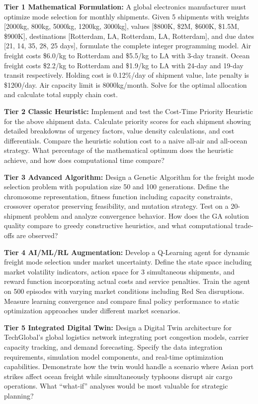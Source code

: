 \documentclass{article}
\begin{document}
\textbf{Tier 1 Mathematical Formulation:}
A global electronics manufacturer must optimize mode selection for monthly shipments. Given 5 shipments with weights [2000kg, 800kg, 5000kg, 1200kg, 3000kg], values [\$800K, \$2M, \$600K, \$1.5M, \$900K], destinations [Rotterdam, LA, Rotterdam, LA, Rotterdam], and due dates [21, 14, 35, 28, 25 days], formulate the complete integer programming model. Air freight costs \$6.0/kg to Rotterdam and \$5.5/kg to LA with 3-day transit. Ocean freight costs \$2.2/kg to Rotterdam and \$1.9/kg to LA with 24-day and 19-day transit respectively. Holding cost is 0.12\%/day of shipment value, late penalty is \$1200/day. Air capacity limit is 8000kg/month. Solve for the optimal allocation and calculate total supply chain cost.

\textbf{Tier 2 Classic Heuristic:}
Implement and test the Cost-Time Priority Heuristic for the above shipment data. Calculate priority scores for each shipment showing detailed breakdowns of urgency factors, value density calculations, and cost differentials. Compare the heuristic solution cost to a naive all-air and all-ocean strategy. What percentage of the mathematical optimum does the heuristic achieve, and how does computational time compare?

\textbf{Tier 3 Advanced Algorithm:}
Design a Genetic Algorithm for the freight mode selection problem with population size 50 and 100 generations. Define the chromosome representation, fitness function including capacity constraints, crossover operator preserving feasibility, and mutation strategy. Test on a 20-shipment problem and analyze convergence behavior. How does the GA solution quality compare to greedy constructive heuristics, and what computational trade-offs are observed?

\textbf{Tier 4 AI/ML/RL Augmentation:}
Develop a Q-Learning agent for dynamic freight mode selection under market uncertainty. Define the state space including market volatility indicators, action space for 3 simultaneous shipments, and reward function incorporating actual costs and service penalties. Train the agent on 500 episodes with varying market conditions including Red Sea disruptions. Measure learning convergence and compare final policy performance to static optimization approaches under different market scenarios.

\textbf{Tier 5 Integrated Digital Twin:}
Design a Digital Twin architecture for TechGlobal's global logistics network integrating port congestion models, carrier capacity tracking, and demand forecasting. Specify the data integration requirements, simulation model components, and real-time optimization capabilities. Demonstrate how the twin would handle a scenario where Asian port strikes affect ocean freight while simultaneously typhoons disrupt air cargo operations. What ``what-if'' analyses would be most valuable for strategic planning?
\end{document}
